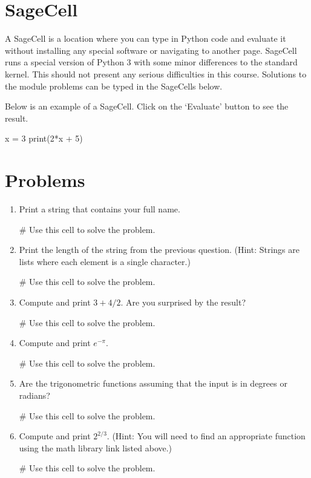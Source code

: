 \documentclass{ximera}
\begin{document}
\section{SageCell}

A SageCell is a location where you can type in Python code and evaluate it without installing any special software or navigating to another page. SageCell runs a special version of Python 3 with some minor differences to the standard kernel. This should not present any serious difficulties in this course. Solutions to the module problems can be typed in the SageCells below.

Below is an example of a SageCell. Click on the `Evaluate' button to see the result.

\begin{sageCell}
x = 3
print(2*x + 5)
\end{sageCell}

\section{Problems}
\begin{enumerate}
    \item Print a string that contains your full name.
\begin{sageCell}
# Use this cell to solve the problem.
\end{sageCell}

    \item Print the length of the string from the previous question. (Hint: Strings are lists where each element is a single character.)
\begin{sageCell}
# Use this cell to solve the problem.
\end{sageCell}

    \item Compute and print $3+4/2$. Are you surprised by the result?
\begin{sageCell}
# Use this cell to solve the problem.
\end{sageCell}

    \item Compute and print $e^{-\pi}$.
\begin{sageCell}
# Use this cell to solve the problem.
\end{sageCell}

    \item Are the trigonometric functions assuming that the input is in degrees or radians?
\begin{sageCell}
# Use this cell to solve the problem.
\end{sageCell}

    \item Compute and print $2^{2/3}$. (Hint: You will need to find an appropriate function using the math library link listed above.)
\begin{sageCell}
# Use this cell to solve the problem.
\end{sageCell}

\end{enumerate}
\end{document}
